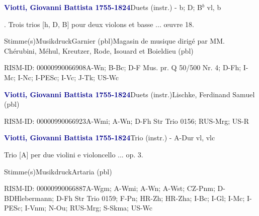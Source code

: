 \documentclass[twocolumn]{book}
\begin{document}
\par \vspace{7pt} \textcolor{darkblue}{\textbf{Viotti, Giovanni Battista  1755-1824}}\hfillplus{\textbf{[337]}}\newline Duets (instr.) - b; D; B$^b$ vl, b
\par \begin{itshape}. Trois trios [h, D, B] pour deux violons et basse ... œuvre 18.\end{itshape} 
\par \textcolor{darkblue}{}  Stimme(s)\newline Musikdruck\newline Garnier  (pbl)\newline Magasin de musique dirigé par MM. Chérubini, Méhul, Kreutzer, Rode, Isouard et Boieldieu  (pbl)
\par RISM-ID: 00000990066908\newline A-Wn; B-Bc; D-F  Mus. pr. Q 50/500 Nr. 4; D-Fh; I-Mc; I-Nc; I-PESc; I-Vc; J-Tk; US-Wc
\par \vspace{7pt} \textcolor{darkblue}{\textbf{Viotti, Giovanni Battista  1755-1824}}\hfillplus{\textbf{[338]}}\newline Duets (instr.)\newline Lischke, Ferdinand Samuel  (pbl)
\par RISM-ID: 00000990066923\newline A-Wmi; A-Wn; D-Fh  Str Trio 0156; RUS-Mrg; US-R
\par \vspace{7pt} \textcolor{darkblue}{\textbf{Viotti, Giovanni Battista  1755-1824}}\hfillplus{\textbf{[339]}}\newline Trio (instr.) - A-Dur vl, vlc
\par \begin{itshape}Trio [A] per due violini e violoncello ... op. 3.\end{itshape} 
\par \textcolor{darkblue}{}  Stimme(s)\newline Musikdruck\newline Artaria  (pbl)
\par RISM-ID: 00000990066887\newline A-Wgm; A-Wmi; A-Wn; A-Wst; CZ-Pnm; D-BDHlebermann; D-Fh  Str Trio 0159; F-Pn; HR-Zh; HR-Zha; I-Bc; I-Gl; I-Mc; I-PESc; I-Vnm; N-Ou; RUS-Mrg; S-Skma; US-Wc
\end{document}
